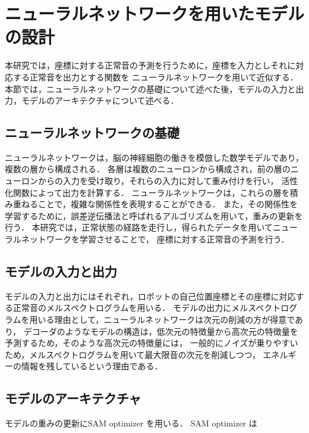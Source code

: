 \documentclass[../main]{subfiles}
\begin{document}
\section{ニューラルネットワークを用いたモデルの設計}
\label{sec:pmethod_neural_network}

本研究では，座標に対する正常音の予測を行うために，座標を入力としそれに対応する正常音を出力とする関数を
ニューラルネットワークを用いて近似する．
本節では，ニューラルネットワークの基礎について述べた後，モデルの入力と出力，モデルのアーキテクチャについて述べる．
\subsection{ニューラルネットワークの基礎}
ニューラルネットワークは，脳の神経細胞の働きを模倣した数学モデルであり，複数の層から構成される．
各層は複数のニューロンから構成され，前の層のニューロンからの入力を受け取り，それらの入力に対して重み付けを行い，
活性化関数によって出力を計算する．
ニューラルネットワークは，これらの層を積み重ねることで，複雑な関係性を表現することができる．
また，その関係性を学習するために，誤差逆伝播法と呼ばれるアルゴリズムを用いて，重みの更新を行う．
本研究では，正常状態の経路を走行し，得られたデータを用いてニューラルネットワークを学習させることで，
座標に対する正常音の予測を行う．
\subsection{モデルの入力と出力}
モデルの入力と出力にはそれぞれ，ロボットの自己位置座標とその座標に対応する正常音のメルスペクトログラムを用いる．
モデルの出力にメルスペクトログラムを用いる理由として，ニューラルネットワークは次元の削減の方が得意であり，
デコーダのようなモデルの構造は，低次元の特徴量から高次元の特徴量を予測するため，そのような高次元の特徴量には，
一般的にノイズが乗りやすいため，メルスペクトログラムを用いて最大限音の次元を削減しつつ，
エネルギーの情報を残しているという理由である．
\subsection{モデルのアーキテクチャ}
モデルの重みの更新にSAM optimizer を用いる．
SAM optimizer は
\end{document}
